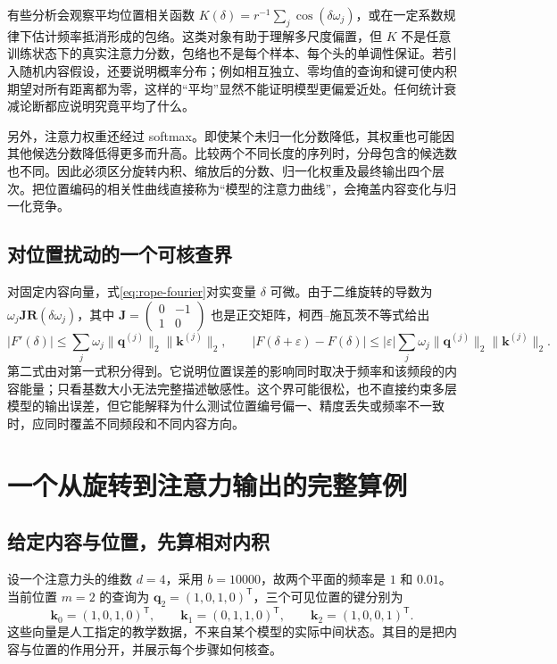 \documentclass[UTF8,12pt,a4paper,fontset=fandol]{ctexart}
\begin{document}
有些分析会观察平均位置相关函数 $K(\delta)=r^{-1}\sum_j\cos(\delta\omega_j)$，或在一定系数规律下估计频率抵消形成的包络。这类对象有助于理解多尺度偏置，但 $K$ 不是任意训练状态下的真实注意力分数，包络也不是每个样本、每个头的单调性保证。若引入随机内容假设，还要说明概率分布；例如相互独立、零均值的查询和键可使内积期望对所有距离都为零，这样的“平均”显然不能证明模型更偏爱近处。任何统计衰减论断都应说明究竟平均了什么。

另外，注意力权重还经过 softmax。即使某个未归一化分数降低，其权重也可能因其他候选分数降低得更多而升高。比较两个不同长度的序列时，分母包含的候选数也不同。因此必须区分旋转内积、缩放后的分数、归一化权重及最终输出四个层次。把位置编码的相关性曲线直接称为“模型的注意力曲线”，会掩盖内容变化与归一化竞争。

\subsection{对位置扰动的一个可核查界}
对固定内容向量，式\eqref{eq:rope-fourier}对实变量 $\delta$ 可微。由于二维旋转的导数为 $\omega_j\mathbf J\mathbf R(\delta\omega_j)$，其中 $\mathbf J=\begin{pmatrix}0&-1\\1&0\end{pmatrix}$ 也是正交矩阵，柯西--施瓦茨不等式给出
\begin{equation}
|F'(\delta)|\leq\sum_j\omega_j
\|\mathbf q^{(j)}\|_2\|\mathbf k^{(j)}\|_2,
\qquad
|F(\delta+\varepsilon)-F(\delta)|
\leq|\varepsilon|\sum_j\omega_j
\|\mathbf q^{(j)}\|_2\|\mathbf k^{(j)}\|_2.
\label{eq:rope-lipschitz}
\end{equation}
第二式由对第一式积分得到。它说明位置误差的影响同时取决于频率和该频段的内容能量；只看基数大小无法完整描述敏感性。这个界可能很松，也不直接约束多层模型的输出误差，但它能解释为什么测试位置编号偏一、精度丢失或频率不一致时，应同时覆盖不同频段和不同内容方向。

\section{一个从旋转到注意力输出的完整算例}
\label{sec:rope-example}

\subsection{给定内容与位置，先算相对内积}
设一个注意力头的维数 $d=4$，采用 $b=10000$，故两个平面的频率是 $1$ 和 $0.01$。当前位置 $m=2$ 的查询为 $\mathbf q_2=(1,0,1,0)^{\mathsf T}$，三个可见位置的键分别为
\[
\mathbf k_0=(1,0,1,0)^{\mathsf T},\qquad
\mathbf k_1=(0,1,1,0)^{\mathsf T},\qquad
\mathbf k_2=(1,0,0,1)^{\mathsf T}.
\]
这些向量是人工指定的教学数据，不来自某个模型的实际中间状态。其目的是把内容与位置的作用分开，并展示每个步骤如何核查。
\end{document}
